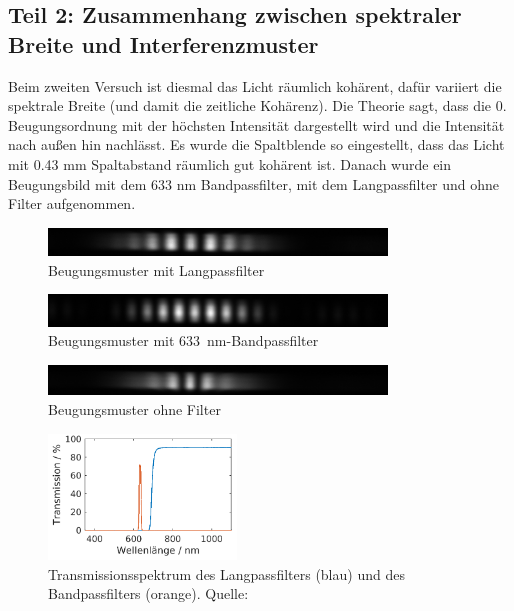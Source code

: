 \documentclass{article}
\begin{document}
\newpage
\subsection{Teil 2: Zusammenhang zwischen spektraler Breite und Interferenzmuster}

Beim zweiten Versuch ist diesmal das Licht räumlich kohärent, dafür variiert die spektrale Breite (und damit die zeitliche Kohärenz). Die Theorie sagt, dass die 0. Beugungsordnung mit der höchsten Intensität dargestellt wird und die Intensität nach außen hin nachlässt. Es wurde die Spaltblende so eingestellt, dass das Licht mit 0.43 mm Spaltabstand räumlich gut kohärent ist. Danach wurde ein Beugungsbild mit dem 633 nm Bandpassfilter, mit dem Langpassfilter und ohne Filter aufgenommen. 

\begin{figure}[H]
\centering
\caption{Beugungsmuster mit Langpassfilter}
\includegraphics[width=9cm]{moodle/img_LP.png}
\end{figure}

\begin{figure}[H]
\centering
\caption{Beugungsmuster mit 633~nm-Bandpassfilter}
\includegraphics[width=9cm]{moodle/img_633BP.png}
\end{figure}

\begin{figure}[H]
\centering
\caption{Beugungsmuster ohne Filter}
\includegraphics[width=9cm]{moodle/img__.png}
\end{figure}

\begin{figure}[H]
\centering
\caption{Transmissionsspektrum des Langpassfilters (blau) und des Bandpassfilters (orange). Quelle: \cite{quelle6}}
\includegraphics[width=5cm]{moodle/filter.png}
\end{figure}
\end{document}
